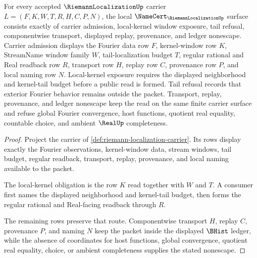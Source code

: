 \begin{theorem}
\label{thm:riemann-localization-namecert-obligations}
For every accepted $\RiemannLocalizationUp$ carrier $L=(F,K,W,T,R,H,C,P,N)$, the local $\NameCert_{\RiemannLocalizationUp}$ surface consists exactly of carrier admission, local-kernel window exposure, tail refusal, componentwise transport, displayed replay, provenance, and ledger nonescape. Carrier admission displays the Fourier data row $F$, kernel-window row $K$, StreamName window family $W$, tail-localization budget $T$, regular rational and Real readback row $R$, transport row $H$, replay row $C$, provenance row $P$, and local naming row $N$. Local-kernel exposure requires the displayed neighborhood and kernel-tail budget before a public read is formed. Tail refusal records that exterior Fourier behavior remains outside the packet. Transport, replay, provenance, and ledger nonescape keep the read on the same finite carrier surface and refuse global Fourier convergence, host functions, quotient real equality, countable choice, and ambient $\RealUp$ completeness.
\end{theorem}
\begin{proof}
Project the carrier of \autoref{def:riemann-localization-carrier}. Its rows display exactly the Fourier observations, kernel-window data, stream windows, tail budget, regular readback, transport, replay, provenance, and local naming available to the packet.

The local-kernel obligation is the row $K$ read together with $W$ and $T$. A consumer first names the displayed neighborhood and kernel-tail budget, then forms the regular rational and Real-facing readback through $R$.

The remaining rows preserve that route. Componentwise transport $H$, replay $C$, provenance $P$, and naming $N$ keep the packet inside the displayed $\BHist$ ledger, while the absence of coordinates for host functions, global convergence, quotient real equality, choice, or ambient completeness supplies the stated nonescape.
\end{proof}

